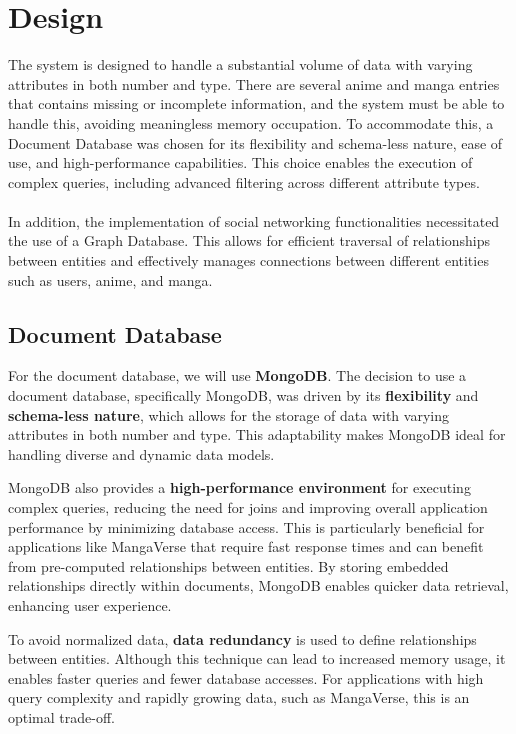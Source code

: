 \chapter{Design}
The system is designed to handle a substantial volume of data with varying attributes in both number and type. 
There are several anime and manga entries that contains missing or incomplete information, and the system must be able to handle this,
avoiding meaningless memory occupation. To accommodate this, a Document Database was chosen for its flexibility and schema-less nature,
ease of use, and high-performance capabilities. This choice enables the execution of complex queries, 
including advanced filtering across different attribute types.
\\ \\
In addition, the implementation of social networking functionalities necessitated the use of a Graph Database. 
This allows for efficient traversal of relationships between entities and effectively manages connections between 
different entities such as users, anime, and manga.


\section{Document Database}

For the document database, we will use \textbf{MongoDB}. The decision to use a document database, 
specifically MongoDB,  was driven by its \textbf{flexibility} and \textbf{schema-less nature}, 
which allows for the storage of data with varying attributes in both number and type. 
This adaptability makes MongoDB ideal for handling diverse and dynamic data models.

\vspace{\baselineskip}

MongoDB also provides a \textbf{high-performance environment} for executing complex queries, 
reducing the need for joins and improving overall application performance by minimizing database 
access. This is particularly beneficial for applications like MangaVerse that require fast response 
times and can benefit from pre-computed relationships between entities. By storing embedded 
relationships directly within documents, MongoDB enables quicker data retrieval, enhancing user experience.

\vspace{\baselineskip}

To avoid normalized data, \textbf{data redundancy} is used to define relationships between entities.
Although this technique can lead to increased memory usage, it enables faster queries and fewer 
database accesses. For applications with high query complexity and rapidly growing data, 
such as MangaVerse, this is an optimal trade-off.

